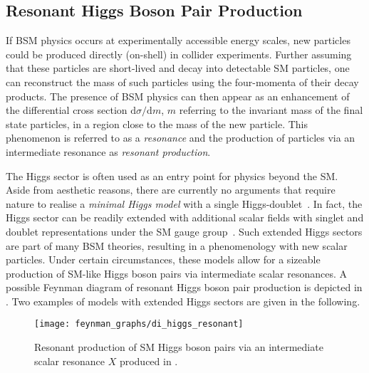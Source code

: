 

\subsection{Resonant Higgs Boson Pair Production}%
\label{sec:bsm_resonant_hh}

If BSM physics occurs at experimentally accessible energy scales, new particles
could be produced directly (on-shell) in collider experiments. Further assuming
that these particles are short-lived and decay into detectable SM particles, one
can reconstruct the mass of such particles using the four-momenta of their decay
products. The presence of BSM physics can then appear as an enhancement of the
differential cross section $\mathrm{d}\sigma / \mathrm{d}m$, $m$ referring to
the invariant mass of the final state particles, in a region close to the mass
of the new particle. This phenomenon is referred to as a \emph{resonance} and
the production of particles via an intermediate resonance as \emph{resonant
  production}.

The Higgs sector is often used as an entry point for physics beyond the
SM. Aside from aesthetic reasons, there are currently no arguments that require
nature to realise a \emph{minimal Higgs model} with a single
Higgs-doublet~\cite{Gunion:1989we}. In fact, the Higgs sector can be readily
extended with additional scalar fields with singlet and doublet representations
under the SM gauge group~\cite{Gunion:1989we}. Such extended Higgs sectors are
part of many BSM theories, resulting in a phenomenology with new scalar
particles. Under certain circumstances, these models allow for a sizeable
production of SM-like Higgs boson pairs via intermediate scalar resonances. A
possible Feynman diagram of resonant Higgs boson pair production is depicted in
. Two examples of models with extended Higgs
sectors are given in the following.

\begin{figure}[htbp]
  \centering

  \texttt{[image: feynman\_graphs/di\_higgs\_resonant]}

  \caption[Feynman diagram of resonant Higgs boson pair production.]{Resonant
    production of SM Higgs boson pairs via an intermediate scalar resonance $X$
    produced in \ggF.}%
  \label{fig:resonant_production_feyn}
\end{figure}

